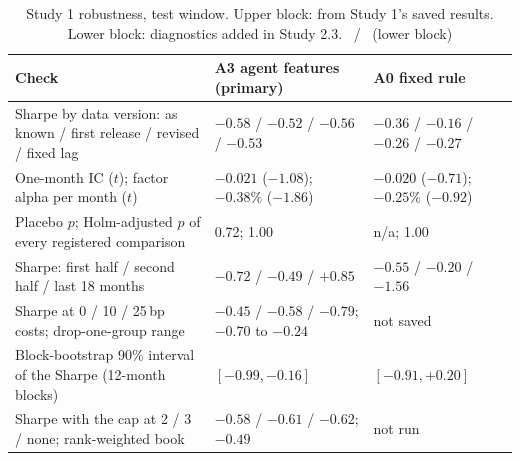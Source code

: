 \begin{table}[!htbp]
\centering\footnotesize
\caption{Study 1 robustness, test window. Upper block: from Study 1's saved results. Lower block: diagnostics added in Study 2.3. \hfill\tagc\ / \tagp\ (lower block)}
\label{tab:s1robust}
\begin{tabularx}{\textwidth}{@{}Y l l@{}}
\toprule
Check & A3 agent features (primary) & A0 fixed rule \\
\midrule
Sharpe by data version: as known / first release / revised / fixed lag & $-0.58$ / $-0.52$ / $-0.56$ / $-0.53$ & $-0.36$ / $-0.16$ / $-0.26$ / $-0.27$ \\ %
One-month IC ($t$); factor alpha per month ($t$) & $-0.021$ ($-1.08$); $-0.38\%$ ($-1.86$) & $-0.020$ ($-0.71$); $-0.25\%$ ($-0.92$) \\ %
Placebo $p$; Holm-adjusted $p$ of every registered comparison & 0.72; 1.00 & n/a; 1.00 \\ %
Sharpe: first half / second half / last 18 months & $-0.72$ / $-0.49$ / $+0.85$ & $-0.55$ / $-0.20$ / $-1.56$ \\ %
Sharpe at 0 / 10 / 25\,bp costs; drop-one-group range & $-0.45$ / $-0.58$ / $-0.79$; $-0.70$ to $-0.24$ & not saved \\ %
\midrule
Block-bootstrap 90\% interval of the Sharpe (12-month blocks) & $[-0.99,-0.16]$ & $[-0.91,+0.20]$ \\ %
Sharpe with the cap at 2 / 3 / none; rank-weighted book & $-0.58$ / $-0.61$ / $-0.62$; $-0.49$ & not run \\ %
\bottomrule
\end{tabularx}
\end{table}

